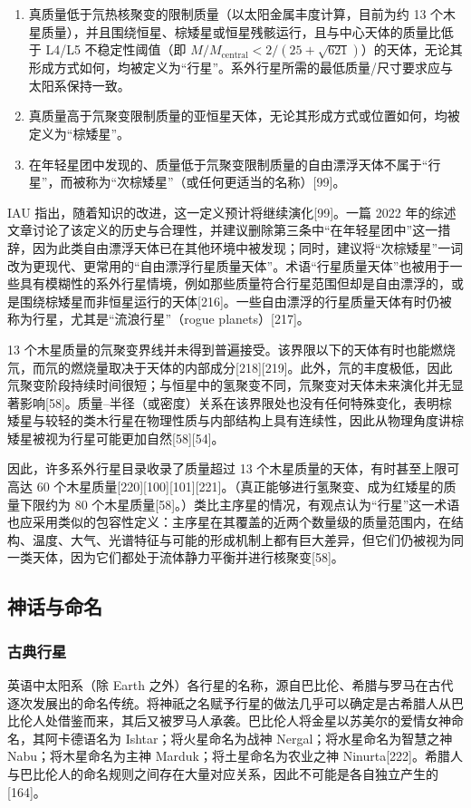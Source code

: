 \begin{enumerate}
\item 真质量低于氘热核聚变的限制质量（以太阳金属丰度计算，目前为约 13 个木星质量），并且围绕恒星、棕矮星或恒星残骸运行，且与中心天体的质量比低于 L4/L5 不稳定性阈值（即 $M/M_{\text{central}} < 2/(25+\sqrt{621})$）的天体，无论其形成方式如何，均被定义为“行星”。系外行星所需的最低质量/尺寸要求应与太阳系保持一致。
\item 真质量高于氘聚变限制质量的亚恒星天体，无论其形成方式或位置如何，均被定义为“棕矮星”。
\item 在年轻星团中发现的、质量低于氘聚变限制质量的自由漂浮天体不属于“行星”，而被称为“次棕矮星”（或任何更适当的名称）[99]。
\end{enumerate}
IAU 指出，随着知识的改进，这一定义预计将继续演化[99]。一篇 2022 年的综述文章讨论了该定义的历史与合理性，并建议删除第三条中“在年轻星团中”这一措辞，因为此类自由漂浮天体已在其他环境中被发现；同时，建议将“次棕矮星”一词改为更现代、更常用的“自由漂浮行星质量天体”。术语“行星质量天体”也被用于一些具有模糊性的系外行星情境，例如那些质量符合行星范围但却是自由漂浮的，或是围绕棕矮星而非恒星运行的天体[216]。一些自由漂浮的行星质量天体有时仍被称为行星，尤其是“流浪行星”（rogue planets）[217]。

13 个木星质量的氘聚变界线并未得到普遍接受。该界限以下的天体有时也能燃烧氘，而氘的燃烧量取决于天体的内部成分[218][219]。此外，氘的丰度极低，因此氘聚变阶段持续时间很短；与恒星中的氢聚变不同，氘聚变对天体未来演化并无显著影响[58]。质量–半径（或密度）关系在该界限处也没有任何特殊变化，表明棕矮星与较轻的类木行星在物理性质与内部结构上具有连续性，因此从物理角度讲棕矮星被视为行星可能更加自然[58][54]。

因此，许多系外行星目录收录了质量超过 13 个木星质量的天体，有时甚至上限可高达 60 个木星质量[220][100][101][221]。（真正能够进行氢聚变、成为红矮星的质量下限约为 80 个木星质量[58]。）类比主序星的情况，有观点认为“行星”这一术语也应采用类似的包容性定义：主序星在其覆盖的近两个数量级的质量范围内，在结构、温度、大气、光谱特征与可能的形成机制上都有巨大差异，但它们仍被视为同一类天体，因为它们都处于流体静力平衡并进行核聚变[58]。
\subsection{神话与命名}
\subsubsection{古典行星}
英语中太阳系（除 Earth 之外）各行星的名称，源自巴比伦、希腊与罗马在古代逐次发展出的命名传统。将神祇之名赋予行星的做法几乎可以确定是古希腊人从巴比伦人处借鉴而来，其后又被罗马人承袭。巴比伦人将金星以苏美尔的爱情女神命名，其阿卡德语名为 Ishtar；将火星命名为战神 Nergal；将水星命名为智慧之神 Nabu；将木星命名为主神 Marduk；将土星命名为农业之神 Ninurta[222]。希腊人与巴比伦人的命名规则之间存在大量对应关系，因此不可能是各自独立产生的[164]。

